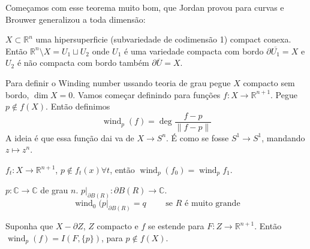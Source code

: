 Começamos com esse teorema muito bom, que Jordan provou para curvas e Brouwer generalizou a toda dimensão:

\begin{thm}\leavevmode
\(X \subset \mathbb{R}^n\) uma hipersuperficie (subvariedade de codimensão 1) compact conexa. Então \(\mathbb{R}^n\setminus X= U_1 \sqcup U_2\) onde \(U_1\) é uma variedade compacta com bordo \(\partial \overline{U_1}=X\) e \(U_2\) é não compacta com bordo também \(\partial \overline{U}=X\).
\end{thm}

Para definir o Winding number ussando teoria de grau pegue \(X\) compacto sem bordo, \(\dim X=0\). Vamos começar definindo para funções \(f:X \to \mathbb{R}^{n+1}\). Pegue \(p \not \in f(X)\). Então definimos
\[\operatorname{wind}_p(f)=\operatorname{deg}\frac{f-p}{\|f-p\|}\]
A ideia é que essa função dai va de \(X \to S^n\). É como se fosse \(S^1\to S^1\), mandando \(z \mapsto  z^n\).

\begin{remark}\leavevmode
	\(f_t: X \to \mathbb{R}^{n+1}\), \(p \not \in f_t(x) \forall  t\), então \(\operatorname{wind}_p(f_0)=\operatorname{wind}_pf_1\).
\end{remark}

\begin{example}\leavevmode
\(p: \mathbb{C} \to \mathbb{C}\) de grau \(n\). \(p |_{\partial B(R)}:\partial  B (R) \to \mathbb{C}\).
\[\operatorname{wind}_0(p|_{\partial  B (R)}=q \qquad  \text{ se \(R\) é muito grande} \]
\end{example}

\begin{prop}\leavevmode
	Suponha que \(X - \partial  Z\), \(Z\) compacto e \(f \) se estende para \(F:Z \to \mathbb{R}^{n+1}\). Então \(\operatorname{wind}_p (f)=I(F, \{p\})\), para \(p \not \in f(X)\).
\end{prop}

